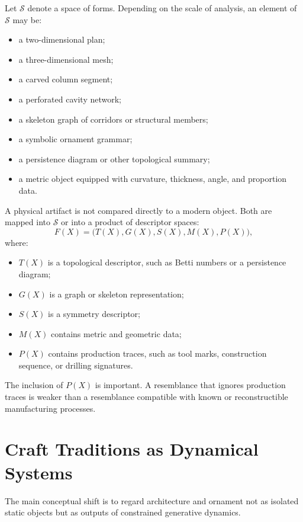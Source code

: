 Let $\mathcal{S}$ denote a space of forms. Depending on the scale of analysis, an element of $\mathcal{S}$ may be:
\begin{itemize}
    \item a two-dimensional plan;
    \item a three-dimensional mesh;
    \item a carved column segment;
    \item a perforated cavity network;
    \item a skeleton graph of corridors or structural members;
    \item a symbolic ornament grammar;
    \item a persistence diagram or other topological summary;
    \item a metric object equipped with curvature, thickness, angle, and proportion data.
\end{itemize}

A physical artifact is not compared directly to a modern object. Both are mapped into $\mathcal{S}$ or into a product of descriptor spaces:
\begin{equation}
    F(X)=\bigl(T(X),G(X),S(X),M(X),P(X)\bigr),
\end{equation}
where:
\begin{itemize}
    \item $T(X)$ is a topological descriptor, such as Betti numbers or a persistence diagram;
    \item $G(X)$ is a graph or skeleton representation;
    \item $S(X)$ is a symmetry descriptor;
    \item $M(X)$ contains metric and geometric data;
    \item $P(X)$ contains production traces, such as tool marks, construction sequence, or drilling signatures.
\end{itemize}

The inclusion of $P(X)$ is important. A resemblance that ignores production traces is weaker than a resemblance compatible with known or reconstructible manufacturing processes.

\section{Craft Traditions as Dynamical Systems}

The main conceptual shift is to regard architecture and ornament not as isolated static objects but as outputs of constrained generative dynamics.

